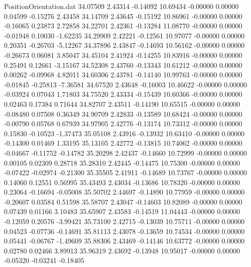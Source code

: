 \begin{filecontents}{PositionOrientation.dat}
  34.07509    2.43314   -0.14092    10.69434   -0.00000    0.00000    0.04599   -0.15276    2.43458
  34.14709    2.43645   -0.15192    10.86961   -0.00000    0.00000   -0.16065    0.23873    2.72858
  34.22701    2.42361   -0.13284    11.08770   -0.00000    0.00000   -0.01948    0.10030   -1.62235
  34.29909    2.42221   -0.12561    10.97077   -0.00000    0.00000    0.20351   -0.26703   -5.12267
  34.37896    2.43847   -0.14693    10.56162   -0.00000    0.00000   -0.26673    0.06081    3.85047
  34.45104    2.41924   -0.14255    10.83916   -0.00000    0.00000    0.25491    0.12661   -3.15167
  34.52308    2.43760   -0.13343    10.61212   -0.00000    0.00000    0.00262   -0.09968    4.82011
  34.60306    2.43781   -0.14140    10.99763   -0.00000    0.00000   -0.01845   -0.25813   -7.36581
  34.67520    2.43648   -0.16003    10.46622   -0.00000    0.00000   -0.03924    0.07043    1.71803
  34.75520    2.43334   -0.15439    10.60366   -0.00000    0.00000    0.02463    0.17384    0.71644
  34.82707    2.43511   -0.14190    10.65515   -0.00000    0.00000   -0.08480    0.07508    0.36349
  34.90709    2.42833   -0.13589    10.68424   -0.00000    0.00000   -0.00790    0.05768    0.67939
  34.97905    2.42776   -0.13174    10.73312   -0.00000    0.00000    0.15830   -0.10523   -1.37473
  35.05108    2.43916   -0.13932    10.63410   -0.00000    0.00000   -0.14300    0.01469    1.33195
  35.13105    2.42772   -0.13815    10.74062   -0.00000    0.00000   -0.04667   -0.11752   -0.14782
  35.20298    2.42437   -0.14660    10.72999   -0.00000    0.00000    0.00105    0.02309    0.28718
  35.28310    2.42445   -0.14475    10.75300   -0.00000    0.00000   -0.07422   -0.02974   -0.21300
  35.35505    2.41911   -0.14689    10.73767   -0.00000    0.00000    0.14060    0.12551    0.56995
  35.43493    2.43034   -0.13686    10.78320   -0.00000    0.00000    0.23064   -0.16694   -0.05008
  35.50702    2.44697   -0.14890    10.77959   -0.00000    0.00000   -0.20607    0.03584    0.51598
  35.58707    2.43047   -0.14603    10.82089   -0.00000    0.00000    0.07439    0.01166    3.10483
  35.65907    2.43583   -0.14519    11.04443   -0.00000    0.00000   -0.12059    0.20576   -3.99421
  35.73100    2.42715   -0.13039    10.75711   -0.00000    0.00000    0.04523   -0.07736   -0.14691
  35.81113    2.43078   -0.13659    10.74534   -0.00000    0.00000    0.05441   -0.06767   -1.49609
  35.88306    2.43469   -0.14146    10.63772   -0.00000    0.00000    0.02780    0.02466    3.89913
  35.96319    2.43692   -0.13948    10.95017   -0.00000    0.00000   -0.05320   -0.03241   -0.18405

\end{filecontents}
